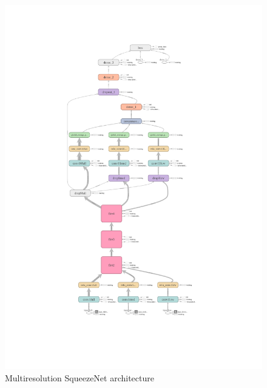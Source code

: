 \documentclass{article}
\begin{document}
{\begin{figure}[h]
  \vspace*{-40mm}
  \includegraphics[scale=0.8]{actualsqueezemodelhires.pdf}
  \vspace*{-35mm}
  \caption{Multiresolution SqueezeNet architecture}
  \label{fig:squeezenetgraph}
\end{figure}

}
\end{document}
